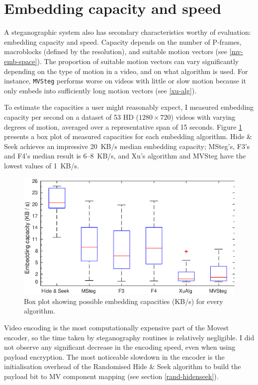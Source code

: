\documentclass[12pt,british,twoside,notitlepage,usenames,dvipsnames,hypens,final]{report}
\numberwithin{equation}{section}
\numberwithin{figure}{section}
\begin{document}
\section{Embedding capacity and speed}

A steganographic system also has secondary characteristics worthy of evaluation: embedding capacity and speed. Capacity depends on the number of P-frames, macroblocks (defined by the resolution), and suitable motion vectors (see \ref{mv-emb-space}). The proportion of suitable motion vectors can vary significantly depending on the type of motion in a video, and on what algorithm is used. For instance, \texttt{MVSteg} performs worse on videos with little or slow motion because it only embeds into sufficiently long motion vectors (see \ref{xu-alg}).

To estimate the capacities a user might reasonably expect, I measured embedding capacity per second on a dataset of 53 HD ($1280 \times 720$) videos with varying degrees of motion, averaged over a representative span of 15 seconds. Figure \ref{fig:capacities} presents a box plot of measured capacities for each embedding algorithm. Hide \& Seek achieves an impressive 20~KB/s median embedding capacity; MSteg's, F3's and F4's median result is 6--8~KB/s, and Xu's algorithm and MVSteg have the lowest values of 1~KB/s. 

\begin{figure}[tbh]
\centerline{\includegraphics{img/capacities.eps}}
\caption{Box plot showing possible embedding capacities (KB/s) for every algorithm.}
\label{fig:capacities}
\end{figure}

Video encoding is the most computationally expensive part of the Movest encoder, so the time taken by steganography routines is relatively negligible. I did not observe any significant decrease in the encoding speed, even when using payload encryption. The most noticeable slowdown in the encoder is the initialisation overhead of the Randomised Hide \& Seek algorithm to build the payload bit to MV component mapping (see section \ref{rand-hidenseek}).
\end{document}
